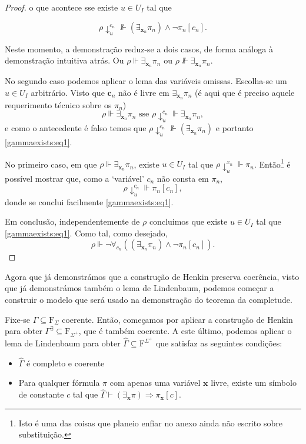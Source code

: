 \documentclass{report}
\theoremstyle{definition}
\theoremstyle{remark}
\renewcommand{\bf}[1]{\mathbf{#1}}
\newcommand{\F}{\mathrm{F}}
\newcommand{\imply}{\mathbin{\Rightarrow}}
\begin{document}
\begin{proof}
	o que acontece sse existe $u \in U_I$ tal que
	
	\begin{equation}\label{gammaexists:eq1}
	\rho\!\downarrow^{c_n}_u \nVdash (\exists_{\bf x_n} \pi_n) \land \neg \pi_n[c_n].
	\end{equation}
	
	Neste momento, a demonstração reduz-se a dois casos, de forma análoga à demonstração intuitiva atrás. Ou $\rho \Vdash \exists_{\bf x_n} \pi_n$ ou $\rho \nVdash \exists_{\bf x_n} \pi_n$.
	
	No segundo caso podemos aplicar o lema das variáveis omissas. Escolha-se um $u \in U_I$ arbitrário. Visto que $\bf c_n$ não é livre em $\exists_{\bf x_n} \pi_n$ (é aqui que é preciso aquele requerimento técnico sobre os $\pi_n$)
	\[\rho \Vdash \exists_{\bf x_n} \pi_n \text{ sse } \rho\!\downarrow^{c_n}_u \Vdash \exists_{\bf x_n} \pi_n, \]
	e como o antecedente é falso temos que $\rho\!\downarrow^{c_n}_u \nVdash (\exists_{\bf x_n} \pi_n)$ e portanto \eqref{gammaexists:eq1}.
	
	No primeiro caso, em que $\rho \Vdash \exists_{\bf x_n} \pi_n$, existe $u \in U_I$ tal que $\rho\!\downarrow^{x_n}_u \Vdash \pi_n$. Então\footnote{Isto é uma das coisas que planeio enfiar no anexo ainda não escrito sobre substituição.} é possível mostrar que, como a `variável' $c_n$ não consta em $\pi_n$,
	\[\rho\!\downarrow^{c_n}_u \Vdash \pi_n[c_n],\]
	donde se conclui facilmente \eqref{gammaexists:eq1}.

	Em conclusão, independentemente de $\rho$ concluimos que existe $u \in U_I$ tal que \eqref{gammaexists:eq1}. Como tal, como desejado,
\[\rho \Vdash \neg \forall_{c_n}((\exists_{\bf x_n} \pi_n) \land \neg \pi_n[c_n]).\]
	\end{proof}
	
	Agora que já demonstrámos que a construção de Henkin preserva coerência, visto que já demonstrámos também o lema de Lindenbaum, podemos começar a construir o modelo que será usado na demonstração do teorema da completude.
	
	Fixe-se $\Gamma \subseteq \F_\Sigma$ coerente. Então, começamos por aplicar a construção de Henkin para obter $\Gamma^\exists \subseteq \F_{\Sigma^+}$, que é também coerente. A este último, podemos aplicar o lema de Lindenbaum para obter $\widehat\Gamma \subseteq \F^{\Sigma^+}$ que satisfaz as seguintes condições:
	
	\begin{itemize}
	\item $\widehat\Gamma$ é completo e coerente
	
	\item Para qualquer fórmula $\pi$ com apenas uma variável $\bf x$ livre, existe um símbolo de constante $c$ tal que $\widehat\Gamma \vdash (\exists_{\bf x} \pi) \imply \pi_{\bf x}[c]$.
	\end{itemize}
	
\end{document}
